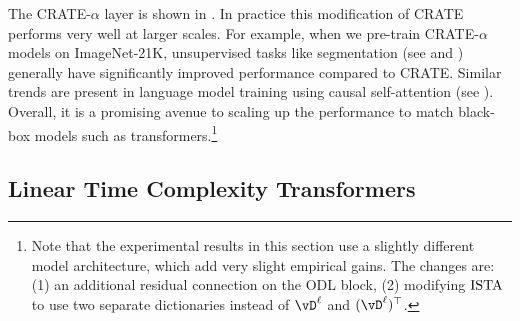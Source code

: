 \documentclass[../../book-main.tex]{subfiles}
\begin{document}
The CRATE-\(\alpha\) layer is shown in . In practice this modification of CRATE performs very well at larger scales. For example, when we pre-train CRATE-\(\alpha\) models on ImageNet-21K, unsupervised tasks like segmentation (see  and ) generally have significantly improved performance compared to CRATE. Similar trends are present in language model training using causal self-attention (see ). Overall, it is a promising avenue to scaling up the performance to match black-box models such as transformers.\footnote{Note that the experimental results in this section use a slightly different model architecture, which add very slight empirical gains. The changes are: (1) an additional residual connection on the ODL block, (2) modifying \(\operatorname{ISTA}\) to use two separate dictionaries instead of \(\vD^{\ell}\) and \((\vD^{\ell})^{\top}\).} 


\subsection{Linear Time Complexity Transformers}\label{sub:tost_experiments}
\end{document}
